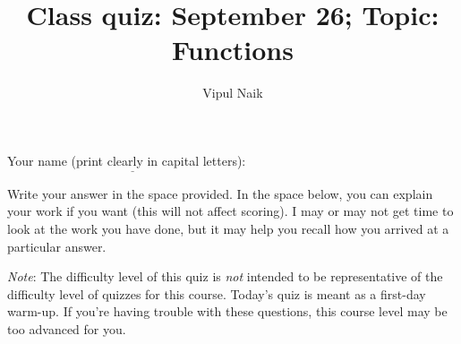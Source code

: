 \documentclass[10pt]{amsart}
\title{Class quiz: September 26; Topic: Functions}
\author{Vipul Naik}
\begin{document}
\maketitle

Your name (print clearly in capital letters): $\underline{\qquad\qquad\qquad\qquad\qquad\qquad\qquad\qquad\qquad\qquad}$

Write your answer in the space provided. In the space below, you can
explain your work if you want (this will not affect scoring). I may or
may not get time to look at the work you have done, but it may help
you recall how you arrived at a particular answer.

{\em Note}: The difficulty level of this quiz is {\em not} intended to
be representative of the difficulty level of quizzes for this
course. Today's quiz is meant as a first-day warm-up. If you're having
trouble with these questions, this course level may be too advanced
for you.
\end{document}

